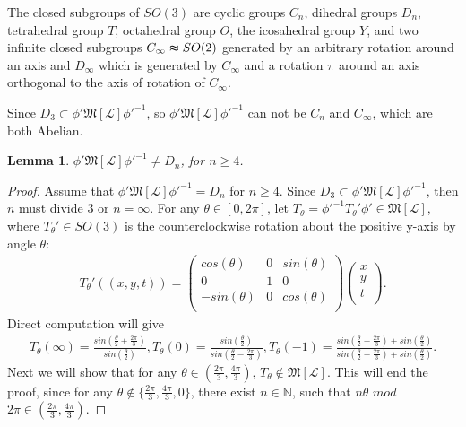 \documentclass{amsart}
\newcommand{\LLL}{\mathcal L} %
\newcommand{\MMM}{\mathfrak M}
\newcommand{\N}{\mathbb N} %
\newtheorem{lemma}{Lemma}[section]
\begin{document}
The closed subgroups of $SO(3)$ are cyclic groups $C_n$, dihedral groups $D_n$, tetrahedral group $T$, octahedral group
$O$, the icosahedral group $Y$, and two infinite closed subgroups $C_{\infty} \thickapprox SO(2)$ generated by an arbitrary
rotation around an axis and $D_{\infty}$ which is generated by $C_{\infty}$ and a rotation $\pi$ around an axis orthogonal to
the axis of rotation of $C_{\infty}$.

Since $D_{3} \subset \phi' \MMM[\LLL] \phi'^{-1}$, so $\phi' \MMM[\LLL] \phi'^{-1}$ can not be $C_n$ and $C_{\infty}$, which are both
Abelian.

\begin{lemma}
$\phi' \MMM[\LLL] \phi'^{-1} \neq D_n$, for $n \geq 4$.
\end{lemma}

\begin{proof}
Assume that $\phi' \MMM[\LLL] \phi'^{-1} = D_n$ for $n \geq 4$. Since $D_3 \subset \phi' \MMM[\LLL] \phi'^{-1}$, then $n$ must divide $3$ or $n = \infty$.
For any $\theta \in [0, 2\pi]$, let $T_{\theta} = \phi'^{-1}T_{\theta}' \phi' \in \MMM[\LLL]$, where $T_{\theta}' \in SO(3)$ is the
counterclockwise rotation about the positive y-axis by angle $\theta$:
\begin{align*}
T_{\theta}'((x,y,t)) = \left(
                         \begin{array}{ccc}
                           cos(\theta) & 0 & sin(\theta) \\
                           0 & 1 & 0 \\
                           -sin(\theta) & 0 & cos(\theta) \\
                         \end{array}
                       \right)\left(
                                \begin{array}{c}
                                  x \\
                                  y \\
                                  t \\
                                \end{array}
                              \right).
\end{align*}
Direct computation will give
\begin{align*}
T_{\theta}(\infty) = \frac{sin(\frac{\theta}{2} + \frac{2\pi}{3})}{sin(\frac{\theta}{2})},
T_{\theta}(0) = \frac{sin(\frac{\theta}{2})}{sin(\frac{\theta}{2} - \frac{2\pi}{3})},
T_{\theta}(-1) = \frac{sin(\frac{\theta}{2} + \frac{2\pi}{3})+ sin(\frac{\theta}{2})}{sin(\frac{\theta}{2} - \frac{2\pi}{3}) + sin(\frac{\theta}{2})}.
\end{align*}
Next we will show that for any $\theta \in (\frac{2\pi}{3}, \frac{4\pi}{3})$, $T_{\theta} \notin \MMM[\LLL]$. This will end the proof,
since for any $\theta \notin \{\frac{2\pi}{3}, \frac{4\pi}{3} , 0 \}$, there exist $n \in \N$, such that $n\theta$ $mod$ $2\pi \in
(\frac{2\pi}{3}, \frac{4\pi}{3})$.


\end{proof}
\end{document}
